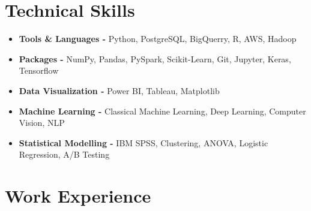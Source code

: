 \documentclass{ExpressiveResume}
\begin{document}
\resumeheader
[
    firstname=Ronnit Roy,
    middleinitial=,
    lastname=Burman,
    email=rrburman@uwaterloo.ca,
    phone=437-988-2357,
    linkedin=ronnitburman,
    github= ronnitburman,
    city=,
    state=,
    qrcode= ./images/ronnit_qr.png,
    fixobjectivespacing=true
]

\objective{
\\	}


\section{Technical Skills}
\begin{itemize}
\item {\textbf{Tools \&  Languages -} Python, PostgreSQL, BigQuerry, R, AWS, Hadoop}
\item {\textbf{Packages -} NumPy, Pandas, PySpark, Scikit-Learn, Git, Jupyter, Keras, Tensorflow}
\item {\textbf{Data Visualization -} Power BI, Tableau, Matplotlib}
\item {\textbf{Machine Learning -} Classical Machine Learning, Deep Learning, Computer Vision, NLP}
\item {\textbf{Statistical Modelling -} IBM SPSS, Clustering, ANOVA, Logistic Regression, A/B Testing}
\\
\end{itemize}


\section{Work Experience}
\end{document}
